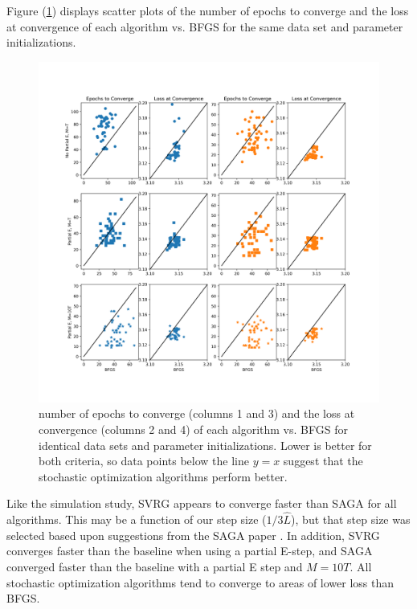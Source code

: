 Figure (\ref{fig:scatter_case}) displays scatter plots of the number of epochs to converge and the loss at convergence of each algorithm vs. BFGS for the same data set and parameter initializations.
%
\begin{figure}
    \centering
    \includegraphics[width=6.5in]{../plt/paired_scatter_case_study.png}
    \caption{number of epochs to converge (columns 1 and 3) and the loss at convergence (columns 2 and 4) of each algorithm vs. BFGS for identical data sets and parameter initializations. Lower is better for both criteria, so data points below the line $y=x$ suggest that the stochastic optimization algorithms perform better.}
    \label{fig:scatter_case}
\end{figure}
%
Like the simulation study, SVRG appears to converge faster than SAGA for all algorithms. This may be a function of our step size ($1/3 \hat L$), but that step size was selected based upon suggestions from the SAGA paper \citep{Defazio:2014}. In addition, SVRG converges faster than the baseline when using a partial E-step, and SAGA converged faster than the baseline with a partial E step and $M=10T$. All stochastic optimization algorithms tend to converge to areas of lower loss than BFGS. 


